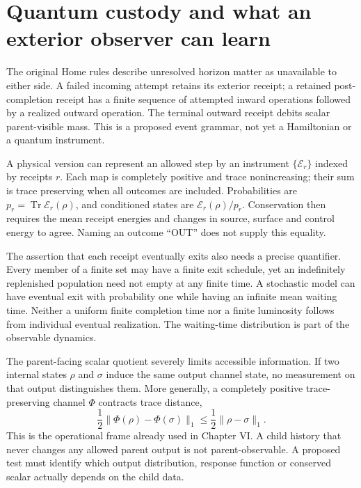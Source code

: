 \section{Quantum custody and what an exterior observer can learn}
The original Home rules describe unresolved horizon matter as unavailable to either side. A failed incoming attempt retains its exterior receipt; a retained post-completion receipt has a finite sequence of attempted inward operations followed by a realized outward operation. The terminal outward receipt debits scalar parent-visible mass. This is a proposed event grammar, not yet a Hamiltonian or a quantum instrument.

A physical version can represent an allowed step by an instrument $\{\mathcal E_r\}$ indexed by receipts $r$. Each map is completely positive and trace nonincreasing; their sum is trace preserving when all outcomes are included. Probabilities are $p_r=\operatorname{Tr}\mathcal E_r(\rho)$, and conditioned states are $\mathcal E_r(\rho)/p_r$. Conservation then requires the mean receipt energies and changes in source, surface and control energy to agree. Naming an outcome ``OUT'' does not supply this equality.

The assertion that each receipt eventually exits also needs a precise quantifier. Every member of a finite set may have a finite exit schedule, yet an indefinitely replenished population need not empty at any finite time. A stochastic model can have eventual exit with probability one while having an infinite mean waiting time. Neither a uniform finite completion time nor a finite luminosity follows from individual eventual realization. The waiting-time distribution is part of the observable dynamics.

The parent-facing scalar quotient severely limits accessible information. If two internal states $\rho$ and $\sigma$ induce the same output channel state, no measurement on that output distinguishes them. More generally, a completely positive trace-preserving channel $\Phi$ contracts trace distance,
\begin{equation}
 \frac12\|\Phi(\rho)-\Phi(\sigma)\|_1
 \leq\frac12\|\rho-\sigma\|_1.
 \label{c12:contraction}
\end{equation}
This is the operational frame already used in Chapter VI. A child history that never changes any allowed parent output is not parent-observable. A proposed test must identify which output distribution, response function or conserved scalar actually depends on the child data.

